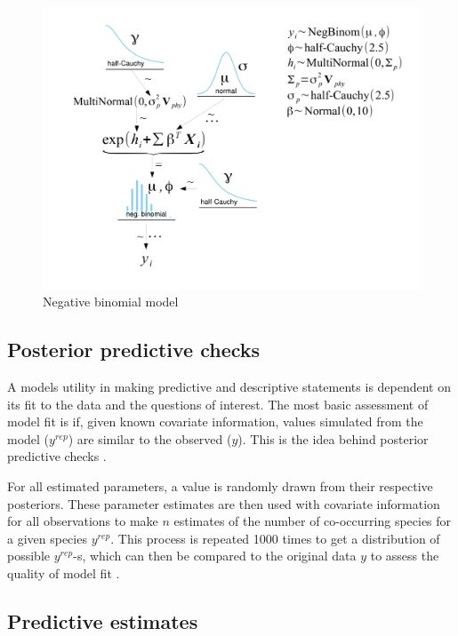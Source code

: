 \documentclass[12pt,letterpaper]{article}
\begin{document}
\begin{figure}[ht]
  \centering
  \includegraphics[height = 0.5\textheight, width = \textwidth, keepaspectratio = true]{figure/mammal_deg_over_model}
  \caption{Negative binomial model}
  \label{fig:nbinmod_diagram}
\end{figure}

\subsection{Posterior predictive checks}

A models utility in making predictive and descriptive statements is dependent on its fit to the data and the questions of interest. The most basic assessment of model fit is if, given known covariate information, values simulated from the model (\(y^{rep}\)) are similar to the observed (\(y\)). This is the idea behind posterior predictive checks \citep{Gelman2013d}. 

For all estimated parameters, a value is randomly drawn from their respective posteriors. These parameter estimates are then used with covariate information for all observations to make \(n\) estimates of the number of co-occurring species for a given species \(y^{rep}\). This process is repeated 1000 times to get a distribution of possible \(y^{rep}\)-s, which can then be compared to the original data \(y\) to assess the quality of model fit \citep{Gelman2013d}.


\subsection{Predictive estimates}
\end{document}
